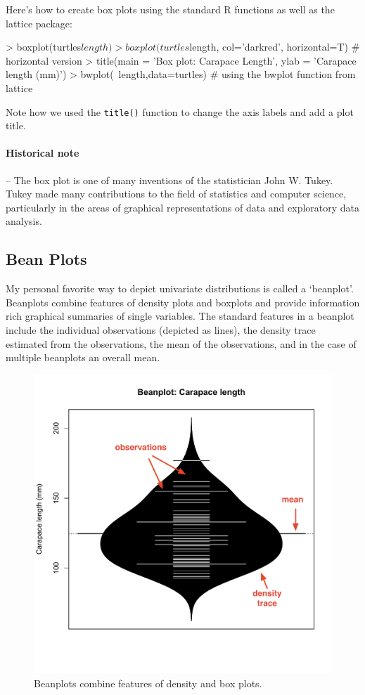 Here's how to create box plots using the standard R functions as well as
the lattice package:

\begin{R}
> boxplot(turtles$length)
> boxplot(turtles$length, col='darkred', horizontal=T) # horizontal version
> title(main = 'Box plot: Carapace Length', ylab = 'Carapace length (mm)')
> bwplot(~length,data=turtles) # using the bwplot function from lattice
\end{R}
Note how we used the \lstinline!title()! function to change the axis
labels and add a plot title.

\paragraph{Historical note}

-- The box plot is one of many inventions of the statistician John W.
Tukey. Tukey made many contributions to the field of statistics and
computer science, particularly in the areas of graphical representations
of data and exploratory data analysis.

\subsection{Bean Plots}

My personal favorite way to depict univariate distributions is called a
`beanplot'. Beanplots combine features of density plots and boxplots and
provide information rich graphical summaries of single variables. The
standard features in a beanplot include the individual observations
(depicted as lines), the density trace estimated from the observations,
the mean of the observations, and in the case of multiple beanplots an
overall mean.

\begin{figure}[htbp]
\centering
\includegraphics[width=0.5\columnwidth]{./figures/hands-on1/beanplot-labeled.pdf}
\caption{Beanplots combine features of density and box plots.}
\end{figure}

